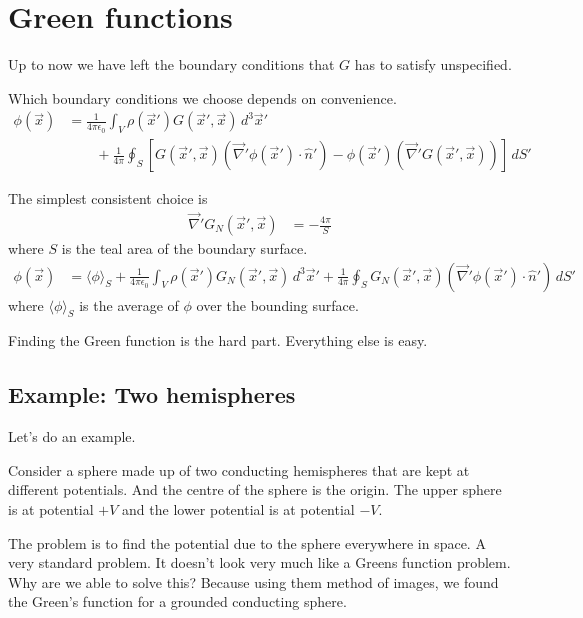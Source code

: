 \section{Green functions}
Up to now we have left the boundary conditions that $G$ has to satisfy
unspecified.

Which boundary conditions we choose depends on convenience.
\begin{align}
    \phi(\vec{x})
    &=
    \frac{1}{4\pi\epsilon_0}
    \int_V \rho\left( \vec{x}' \right) G\left( \vec{x}', \vec{x} \right)\,
    d^3\vec{x}'\\\nonumber
    &\qquad
    + \frac{1}{4\pi}
    \oint_S\left[ 
    G\left( \vec{x}', \vec{x} \right)
    \left( 
    \vec{\nabla}' \phi\left( \vec{x}' \right)
    \cdot \hat{n}'
    \right)
    -
    \phi\left( \vec{x}' \right)
    \left( 
    \vec{\nabla}' G\left( \vec{x}', \vec{x} \right)
    \right)
    \right]\, dS'
\end{align}

The simplest consistent choice is
\begin{align}
    \vec{\nabla}' G_N \left( \vec{x}', \vec{x} \right)
    &=
    -\frac{4\pi}{S}
\end{align}
where $S$ is the teal area of the boundary surface.
\begin{align}
    \phi\left( \vec{x} \right)
    &=
    \langle \phi\rangle_S
    +
    \frac{1}{4\pi\epsilon_0}
    \int_V \rho\left( \vec{x}' \right)
    G_N\left( \vec{x}', \vec{x} \right)
    \, d^3 \vec{x}'
    +
    \frac{1}{4\pi}
    \oint_S G_N\left( \vec{x}', \vec{x} \right)
    \left( 
    \vec{\nabla}' \phi\left( \vec{x}' \right)
    \cdot
    \hat{n}'
    \right)\, dS'
\end{align}
where $\langle \phi\rangle_S$
is the average of $\phi$ over the bounding surface.

Finding the Green function is the hard part.
Everything else is easy.

\subsection{Example: Two hemispheres}
Let's do an example.

Consider a sphere made up of two conducting hemispheres that are kept at
different potentials.
And the centre of the sphere is the origin.
The upper sphere is at potential $+V$ and the lower potential is at potential
$-V$.

The problem is to find the potential due to the sphere everywhere in space.
A very standard problem.
It doesn't look very much like a Greens function problem.
Why are we able to solve this?
Because using them method of images,
we found the Green's function for a grounded conducting sphere.

